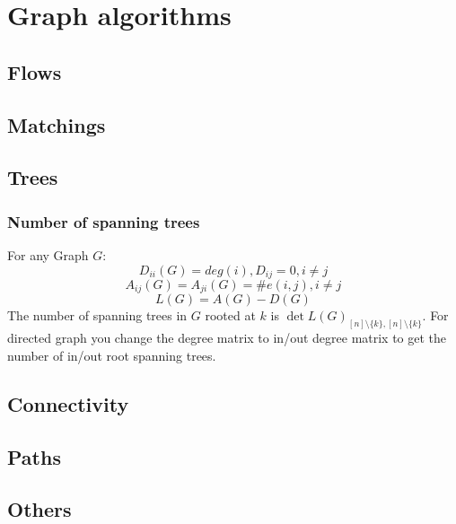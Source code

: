 \chapter{Graph algorithms}
\section{Flows}

\section{Matchings}

\section{Trees}

\begin{compactmath}
\subsection{Number of spanning trees}
For any Graph $G$:
$$
D_{ii}(G) = deg(i), D_{ij}=0,i \neq j
$$
$$
A_{ij}(G)=A_{ji}(G)= \#e(i,j), i \neq j
$$
$$
L(G)=A(G)-D(G)
$$
The number of spanning trees in $G$ rooted at $k$ is $\det L(G)_{[n] \setminus\{k\},[n] \setminus\{k\}}$.
For directed graph you change the degree matrix to in/out degree matrix to get the number of in/out root spanning trees.

\end{compactmath}


\section{Connectivity}

\section{Paths}

\section{Others}
